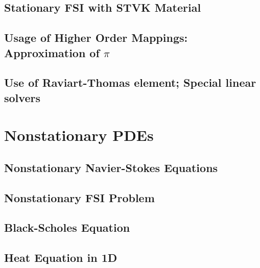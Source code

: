\documentclass[a4paper,cleardoubleempty]{scrreprt}
\theoremstyle{plain}
\theoremstyle{remark}
\begin{document}
\subsection{Stationary FSI with STVK Material} 
\label{PDE_Stat_FSI_STVK}

\clearpage
\subsection{Usage of Higher Order Mappings: Approximation of $\pi$}
\label{PDE_higher_order_mapping}

\clearpage
\subsection{Use of Raviart-Thomas element; Special linear solvers}
\label{PDE_RT}

\clearpage
\section{Nonstationary PDEs}
\label{PDE_Instat}

\subsection{Nonstationary Navier-Stokes Equations}
\label{PDE_Instat_Stokes}

\clearpage
\subsection{Nonstationary FSI Problem}
\label{PDE_Instat_FSI}

\clearpage
\subsection{Black-Scholes Equation}
\label{PDE_Instat_Black_Scholes}

\clearpage
\subsection{Heat Equation in 1D}
\label{PDE_Instat_Heat_1D}

\clearpage
\end{document}
